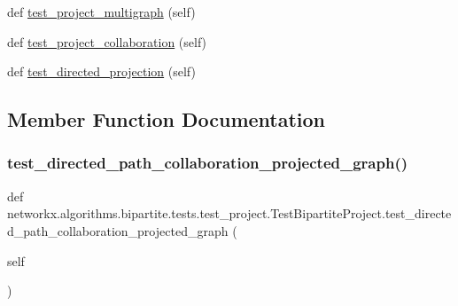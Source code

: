 \begin{DoxyCompactItemize}
\item 
def \hyperlink{classnetworkx_1_1algorithms_1_1bipartite_1_1tests_1_1test__project_1_1TestBipartiteProject_a5223359e4290541ea3cbdd66df2ffe69}{test\+\_\+project\+\_\+multigraph} (self)
\item 
def \hyperlink{classnetworkx_1_1algorithms_1_1bipartite_1_1tests_1_1test__project_1_1TestBipartiteProject_abfb911a0ed5f611f3ecb5b66ff4f56bb}{test\+\_\+project\+\_\+collaboration} (self)
\item 
def \hyperlink{classnetworkx_1_1algorithms_1_1bipartite_1_1tests_1_1test__project_1_1TestBipartiteProject_a41195ed57432955fb113c16219096b05}{test\+\_\+directed\+\_\+projection} (self)
\end{DoxyCompactItemize}


\subsection{Member Function Documentation}
\mbox{\label{classnetworkx_1_1algorithms_1_1bipartite_1_1tests_1_1test__project_1_1TestBipartiteProject_a590995c7ccfdc9f8cdd6f156fb29c1fa}} 
\subsubsection{\texorpdfstring{test\+\_\+directed\+\_\+path\+\_\+collaboration\+\_\+projected\+\_\+graph()}{test\_directed\_path\_collaboration\_projected\_graph()}}
{\footnotesize\ttfamily def networkx.\+algorithms.\+bipartite.\+tests.\+test\+\_\+project.\+Test\+Bipartite\+Project.\+test\+\_\+directed\+\_\+path\+\_\+collaboration\+\_\+projected\+\_\+graph (\begin{DoxyParamCaption}\item[{}]{self }\end{DoxyParamCaption})}

